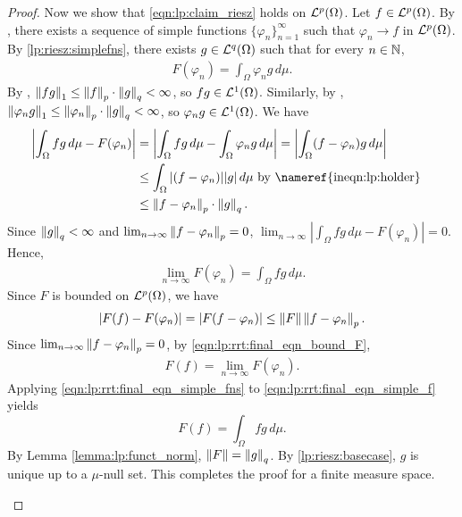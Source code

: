 \begin{proof}
Now we show that \ref{eqn:lp:claim_riesz} holds on ${\mathcal {L}^p}(\Omega)$. Let $f \in {\mathcal {L}^p}(\Omega)$. By , there exists a sequence of simple functions $\{ \varphi_n \}_{n = 1}^{\infty}$ such that $\varphi_n \rightarrow f$ in ${\mathcal {L}^p}(\Omega)$. 
By \ref{lp:riesz:simplefns}, there exists $g \in {\mathcal {L}^q}(\Omega)$ such that for every $n \in {\mathbb N}$, \begin{align*}
    F (\varphi_n) = \int_\Omega \varphi_n g \,d\mu.  
\end{align*}
By , $\left\lVert fg\right\rVert_1 \leq \left\lVert f\right\rVert_p \cdot \left\lVert g\right\rVert_q < \infty$, so $fg \in {\mathcal {L}^1}(\Omega)$.
Similarly, by , $\left\lVert\varphi_n g\right\rVert_1 \leq \left\lVert\varphi_n\right\rVert_p \cdot \left\lVert g\right\rVert_q < \infty$, so $\varphi_n g \in {\mathcal {L}^1}(\Omega)$. We have
\begin{align*}
    \left | \int_\Omega f g \,d\mu  - F (\varphi_n) \right | &= \left |  \int_\Omega f g \,d\mu -  \int_\Omega \varphi_n g \,d\mu  \right | =  \left |  \int_\Omega (f - \varphi_n) g \,d\mu  \right |  & \\
    &\leq  \int_\Omega | (f - \varphi_n) | | g |  \,d\mu \text{ by \nameref{ineqn:lp:holder}} \\
    &\leq \norm{f - \varphi_n}_p \cdot \norm{g}_q.
\end{align*}
Since $\left\lVert g\right\rVert_q < \infty$ and $\lim_{n \to \infty} \left\lVert f - \varphi_n\right\rVert_p = 0$, $\lim_{n \to \infty} \left | \int_\Omega f g \,d\mu  - F (\varphi_n) \right | = 0$.
Hence, \begin{align}
    \label{eqn:lp:rrt:final_eqn_simple_fns}
    \lim_{n \to \infty} F(\varphi_n) = \int_\Omega f g \,d\mu.
\end{align}
Since $F$ is bounded on ${\mathcal {L}^p}(\Omega)$, we have \begin{align}
    \label{eqn:lp:rrt:final_eqn_bound_F}
    | F(f) - F(\varphi_n) | = | F (f - \varphi_n) | \leq \left\lVert F\right\rVert \left\lVert f - \varphi_n\right\rVert_p.
\end{align}
Since $\lim_{n \to \infty} \left\lVert f - \varphi_n\right\rVert_p = 0$, by \ref{eqn:lp:rrt:final_eqn_bound_F}, \begin{align}
    \label{eqn:lp:rrt:final_eqn_simple_f}
    F (f) = \lim_{n \to \infty} F(\varphi_n).
\end{align}
Applying \ref{eqn:lp:rrt:final_eqn_simple_fns} to \ref{eqn:lp:rrt:final_eqn_simple_f} yields \[ 
 F(f) = \int_{\Omega} f g \, d\mu.
\]
By Lemma \ref{lemma:lp:funct_norm}, $\left\lVert F\right\rVert = \left\lVert g\right\rVert_q$. By \ref{lp:riesz:basecase}, $g$ is unique up to a $\mu$-null set. This completes the proof for a finite measure space.
\begin{step}

\end{step}
\end{proof}
